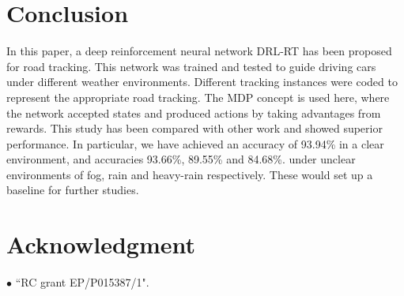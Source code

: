 \documentclass{svproc}
\begin{document}
	\section{Conclusion}
	In this paper, a deep reinforcement neural network DRL-RT has been proposed for road tracking. This network was trained and tested to guide driving cars under different weather environments. Different tracking instances were coded to represent the appropriate road tracking. The MDP concept is used here, where the network accepted states and produced actions by taking advantages from rewards. 
	This study has been compared with other work and showed superior performance. %
	In particular, we have achieved %
	an accuracy of 93.94\% in a clear environment, and  accuracies  93.66\%, 89.55\% and 84.68\%. %
	under unclear environments of fog, rain and heavy-rain respectively. These would set up a baseline for further studies. 
	\section*{Acknowledgment}
	$\bullet$ ``RC grant EP/P015387/1".
	
	
	 
\end{document}
